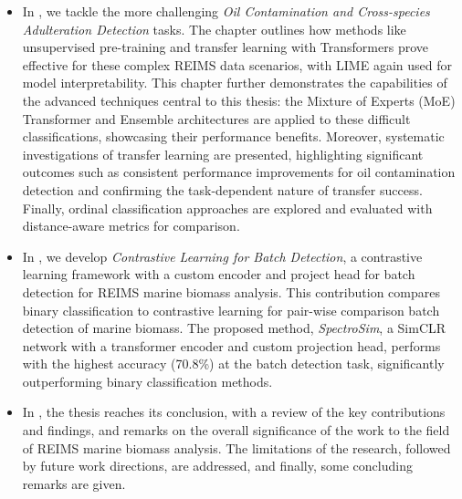 \begin{itemize}
\item In \textbf{}, we tackle the more challenging \textit{Oil Contamination and Cross-species Adulteration Detection} tasks. The chapter outlines how methods like unsupervised pre-training and transfer learning with Transformers prove effective for these complex REIMS data scenarios, with LIME again used for model interpretability. This chapter further demonstrates the capabilities of the advanced techniques central to this thesis: the Mixture of Experts (MoE) Transformer and Ensemble architectures are applied to these difficult classifications, showcasing their performance benefits. Moreover, systematic investigations of transfer learning are presented, highlighting significant outcomes such as consistent performance improvements for oil contamination detection and confirming the task-dependent nature of transfer success. Finally, ordinal classification approaches are explored and evaluated with distance-aware metrics for comparison.

\item In \textbf{}, we develop \textit{Contrastive Learning for Batch Detection}, a contrastive learning framework with a custom encoder and project head for batch detection for REIMS marine biomass analysis. This contribution compares binary classification to contrastive learning for pair-wise comparison batch detection of marine biomass. The proposed method, \textit{SpectroSim}, a SimCLR network with a transformer encoder and custom projection head, performs with the highest accuracy (70.8\%) at the batch detection task, significantly outperforming binary classification methods.

\item In \textbf{}, the thesis reaches its conclusion, with a review of the key contributions and findings, and remarks on the overall significance of the work to the field of REIMS marine biomass analysis. The limitations of the research, followed by future work directions, are addressed, and finally, some concluding remarks are given.


\end{itemize}